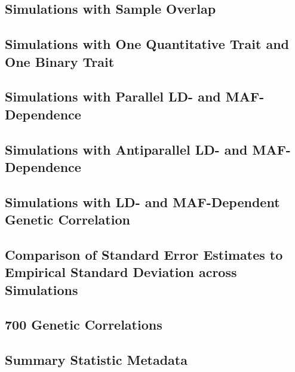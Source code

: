 \documentclass[11pt]{article}
\numberwithin{equation}{section}
\numberwithin{definition}{section}
\numberwithin{thm}{section}
\numberwithin{lemma}{section}
\numberwithin{prop}{section}
\numberwithin{cor}{section}
\numberwithin{hyp}{section}
\begin{document}
\subsection{Simulations with Sample Overlap}
\label{sample_overlap_sim}

\newpage

\newpage
\subsection{Simulations with One Quantitative Trait and One Binary Trait}
\label{qt_cc_sim}


\newpage
\subsection{Simulations with Parallel LD- and MAF-Dependence}
\label{parallel}



\newpage
\subsection{Simulations with Antiparallel LD- and MAF-Dependence}
\label{antiparallel}



\newpage
\subsection{Simulations with LD- and MAF-Dependent Genetic Correlation}
\label{depcor}



\subsection{Comparison of Standard Error Estimates to Empirical Standard Deviation across Simulations}
\label{se_sim}



\newpage
\subsection{700 Genetic Correlations}

\newpage
\subsection{Summary Statistic Metadata}


\newpage


\end{document}
